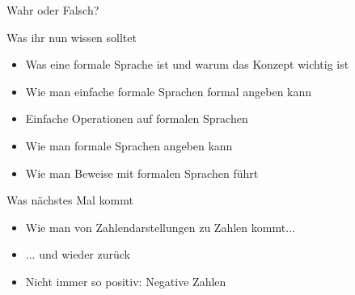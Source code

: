 \begin{frame}[t]{Wahr oder Falsch?}
 	\Socrative
 	
 	\TrueQuestion{$\alA \boder \alB \equiv \alB \boder \alA$}
\end{frame}



%



%

\begin{frame}	
	\begin{block}{Was ihr nun wissen solltet}
		\begin{itemize}
			\item Was eine formale Sprache ist und warum das Konzept wichtig ist
			\item Wie man einfache formale Sprachen formal angeben kann
			\item Einfache Operationen auf formalen Sprachen
			\item Wie man formale Sprachen angeben kann
			\item Wie man Beweise mit formalen Sprachen führt
		\end{itemize}
	\end{block}
	
	\begin{block}{Was nächstes Mal kommt}
		\begin{itemize}
			\item Wie man von Zahlendarstellungen zu Zahlen kommt...
			\item[] ... und wieder zurück
			\item Nicht immer so positiv: Negative Zahlen
		\end{itemize}
	\end{block}
\end{frame}



